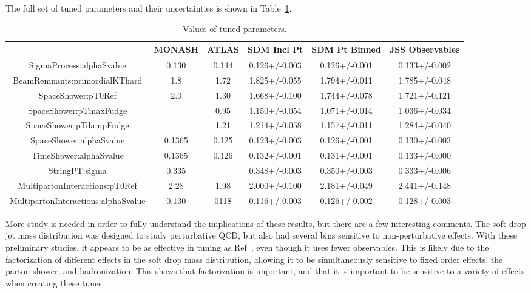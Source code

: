 The full set of tuned parameters and their uncertainties is shown in Table~\ref{tab:tuneResults}. 


\begin{table}[ht!]
\caption{Values of tuned parameters.}
\centering\begin{tabular}{ | c | | c | c | c | c | c |} \hline
                                     & MONASH   & ATLAS  & SDM Incl Pt   & SDM Pt Binned & JSS Observables  \\ \hline
SigmaProcess:alphaSvalue             &  0.130   & 0.144  & 0.126+/-0.003 & 0.126+/-0.001 & 0.133+/-0.002 \\ \hline
BeamRemnants:primordialKThard        &  1.8     & 1.72   & 1.825+/-0.055 & 1.794+/-0.011 & 1.785+/-0.048 \\ \hline
SpaceShower:pT0Ref                   &  2.0     & 1.30   & 1.668+/-0.100 & 1.744+/-0.078 & 1.721+/-0.121 \\ \hline
SpaceShower:pTmaxFudge               &          & 0.95   & 1.150+/-0.054 & 1.071+/-0.014 & 1.036+/-0.034 \\ \hline
SpaceShower:pTdampFudge              &          & 1.21   & 1.214+/-0.058 & 1.157+/-0.011 & 1.284+/-0.040 \\ \hline
SpaceShower:alphaSvalue              &  0.1365  & 0.125  & 0.123+/-0.003 & 0.126+/-0.001 & 0.130+/-0.003 \\ \hline
TimeShower:alphaSvalue               &  0.1365  & 0.126  & 0.132+/-0.001 & 0.131+/-0.001 & 0.133+/-0.000 \\ \hline
StringPT:sigma                       &  0.335   &        & 0.348+/-0.003 & 0.350+/-0.003 & 0.333+/-0.006 \\ \hline
MultipartonInteractions:pT0Ref       &  2.28    & 1.98   & 2.000+/-0.100 & 2.181+/-0.049 & 2.441+/-0.148 \\ \hline
MultipartonInteractions:alphaSvalue  &  0.130   & 0118   & 0.116+/-0.003 & 0.126+/-0.002 & 0.128+/-0.003 \\ \hline
\end{tabular}
\label{tab:tuneResults}
\end{table}



More study is needed in order to fully understand the implications of these results, but there are a few interesting comments. 
The soft drop jet mass distribution was designed to study perturbative QCD, but also had several bins sensitive to non-perturbative effects. 
With these preliminary studies, it appears to be as effective in tuning as Ref~\cite{Aaboud:2019aii}, even though it uses fewer observables. 
This is likely due to the factorization of different effects in the soft drop mass distribution, allowing it to be simultaneously sensitive to fixed order effects, the parton shower, and hadronization. 
This shows that factorization is important, and that it is important to be sensitive to a variety of effects when creating these tunes.







